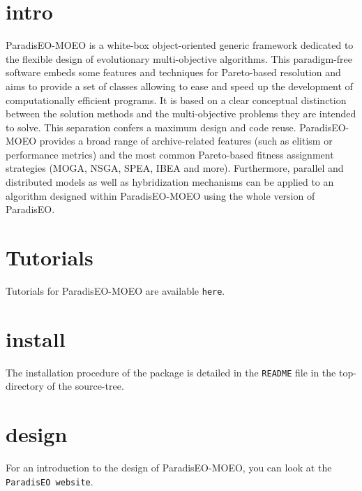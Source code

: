 \section{intro}\label{main_intro}
Paradis\-EO-MOEO is a white-box object-oriented generic framework dedicated to the flexible design of evolutionary multi-objective algorithms. This paradigm-free software embeds some features and techniques for Pareto-based resolution and aims to provide a set of classes allowing to ease and speed up the development of computationally efficient programs. It is based on a clear conceptual distinction between the solution methods and the multi-objective problems they are intended to solve. This separation confers a maximum design and code reuse. Paradis\-EO-MOEO provides a broad range of archive-related features (such as elitism or performance metrics) and the most common Pareto-based fitness assignment strategies (MOGA, NSGA, SPEA, IBEA and more). Furthermore, parallel and distributed models as well as hybridization mechanisms can be applied to an algorithm designed within Paradis\-EO-MOEO using the whole version of Paradis\-EO.\section{Tutorials}\label{main_tutorials}
Tutorials for Paradis\-EO-MOEO are available {\tt here}.\section{install}\label{main_install}
The installation procedure of the package is detailed in the {\tt README} file in the top-directory of the source-tree.\section{design}\label{main_design}
For an introduction to the design of Paradis\-EO-MOEO, you can look at the {\tt Paradis\-EO website}. 